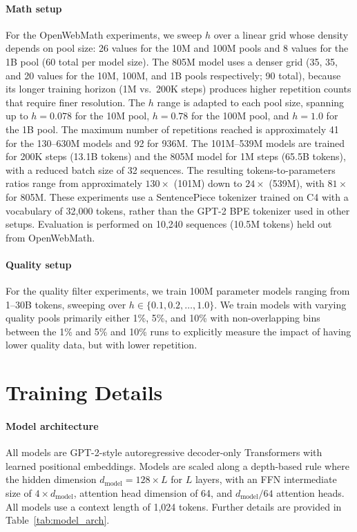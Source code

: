 \paragraph{Math setup}
For the OpenWebMath experiments, we sweep $h$ over a linear grid whose density depends on pool size: 26 values for the 10M and 100M pools and 8 values for the 1B pool (60 total per model size). The 805M model uses a denser grid (35, 35, and 20 values for the 10M, 100M, and 1B pools respectively; 90 total), because its longer training horizon (1M vs.\ 200K steps) produces higher repetition counts that require finer resolution.
The $h$ range is adapted to each pool size, spanning up to $h = 0.078$ for the 10M pool, $h = 0.78$ for the 100M pool, and $h = 1.0$ for the 1B pool.
The maximum number of repetitions reached is approximately 41 for the 130--630M models and 92 for 936M.
The 101M--539M models are trained for 200K steps (13.1B tokens) and the 805M model for 1M steps (65.5B tokens), with a reduced batch size of 32 sequences. The resulting tokens-to-parameters ratios range from approximately $130\times$ (101M) down to $24\times$ (539M), with $81\times$ for 805M.
These experiments use a SentencePiece tokenizer \citep{kudo2018sentencepiece} trained on C4 \citep{raffel2020exploring} with a vocabulary of 32,000 tokens, rather than the GPT-2 BPE tokenizer used in other setups.
Evaluation is performed on 10,240 sequences (10.5M tokens) held out from OpenWebMath.


\paragraph{Quality setup}
For the quality filter experiments, we train 100M parameter models ranging from 1--30B tokens, sweeping over $h \in \{0.1, 0.2, \dots, 1.0\}$.  We train models with varying quality pools primarily either 1\%, 5\%, and 10\% with non-overlapping bins between the 1\% and 5\% and 10\% runs to explicitly measure the impact of having lower quality data, but with lower repetition.  





\section{Training Details}
\label{app:training_details}

\paragraph{Model architecture}
All models are GPT-2-style autoregressive decoder-only Transformers with learned positional embeddings.
Models are scaled along a depth-based rule where the hidden dimension $d_\text{model} = 128 \times L$ for $L$ layers, with an FFN intermediate size of $4 \times d_\text{model}$, attention head dimension of 64, and $d_\text{model}/64$ attention heads.
All models use a context length of 1,024 tokens.
Further details are provided in Table~\ref{tab:model_arch}.

